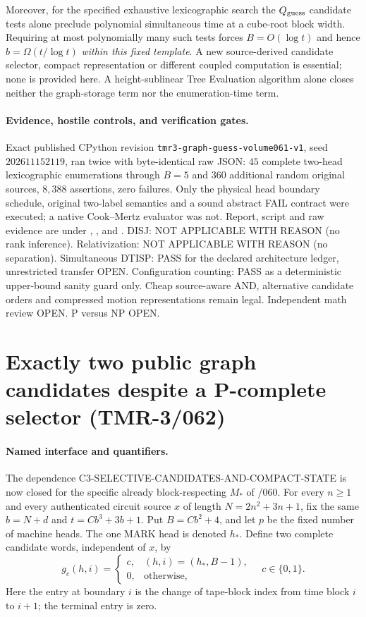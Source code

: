\documentclass[11pt]{article}
\begin{document}
Moreover, for the specified exhaustive lexicographic search the
$Q_{\rm guess}$ candidate tests alone preclude polynomial simultaneous
time at a cube-root block width. Requiring at most polynomially many
such tests forces $B=O(\log t)$ and hence
$b=\Omega(t/\log t)$ \emph{within this fixed template}.
A new source-derived candidate selector, compact representation or
different coupled computation is essential; none is provided here.
A height-sublinear Tree Evaluation algorithm alone closes neither
the graph-storage term nor the enumeration-time term.

\paragraph{Evidence, hostile controls, and verification gates.}
Exact published CPython revision
\texttt{tmr3-graph-guess-volume061-v1}, seed $202611152119$,
ran twice with byte-identical raw JSON: $45$ complete two-head
lexicographic enumerations through $B=5$ and $360$ additional
random original sources, $8{,}388$ assertions, zero failures.
Only the physical head boundary schedule, original two-label
semantics and a sound abstract FAIL contract were executed;
a native Cook--Mertz evaluator was not.
Report, script and raw evidence are under
,
, and
.
DISJ: NOT APPLICABLE WITH REASON (no rank inference).
Relativization: NOT APPLICABLE WITH REASON (no separation).
Simultaneous DTISP: PASS for the declared architecture ledger,
unrestricted transfer OPEN. Configuration counting: PASS as a
deterministic upper-bound sanity guard only.
Cheap source-aware AND, alternative candidate orders and compressed
motion representations remain legal. Independent math review OPEN.
P versus NP OPEN.


\section{Exactly two public graph candidates despite a P-complete selector (TMR-3/062)}
\paragraph{Named interface and quantifiers.}
The dependence \textsf{C3-SELECTIVE-CANDIDATES-AND-COMPACT-STATE}
is now closed for the specific already block-respecting $M_*$ of /060.
For every $n\ge1$ and every authenticated circuit source $x$ of
length $N=2n^2+3n+1$, fix the same $b=N+d$ and
$t=Cb^3+3b+1$. Put $B=Cb^2+4$, and let $p$ be the fixed
number of machine heads. The one MARK head is denoted $h_*$.
Define two complete candidate words, independent of $x$, by
\[
 g_c(h,i)=\begin{cases}
 c,&(h,i)=(h_*,B-1),\\
 0,&\text{otherwise},
 \end{cases}\quad c\in\{0,1\}.
\]
Here the entry at boundary $i$ is the change of tape-block index
from time block $i$ to $i+1$; the terminal entry is zero.
\end{document}
